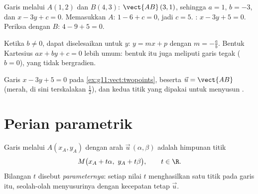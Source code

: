 \begin{example}\label{ex:g11:vect:twopoints}
Garis melalui $A(1, 2)$ dan $B(4, 3)$: $\vect{AB}\,(3, 1)$, sehingga
$a = 1$, $b = -3$, dan  $x - 3y + c = 0$. Memasukkan $A$:
$1 - 6 + c = 0$, jadi $c = 5$. : $x - 3y + 5 = 0$. Periksa dengan
$B$: $4 - 9 + 5 = 0$.
\end{example}

\begin{remark}
Ketika $b \neq 0$,  dapat diselesaikan untuk $y$: $y = mx + p$
dengan  $m = -\frac ab$. Bentuk Kartesius $ax + by + c = 0$ lebih
umum: bentuk itu juga meliputi garis tegak ($b = 0$), yang tidak bergradien.
\end{remark}

\begin{omfigure}

{\small Garis $x - 3y + 5 = 0$ pada \cref{ex:g11:vect:twopoints}, beserta
 $\vec u = \vect{AB}$ (merah, di sini terskalakan $\frac12$),
dan kedua titik yang dipakai untuk menyusun .}
\end{omfigure}

\section{Perian parametrik}

\begin{definition}\label{def:g11:vect:parametric}
Garis melalui $A(x_A, y_A)$ dengan arah $\vec u\,(\alpha, \beta)$ adalah
himpunan titik
\[
M\bigl(x_A + t\alpha,\ y_A + t\beta\bigr), \qquad t \in \R .
\]
Bilangan $t$ disebut \emph{parameternya}: setiap nilai $t$ menghasilkan satu
titik pada garis itu, seolah-olah menyusurinya dengan kecepatan tetap $\vec u$.
\end{definition}


